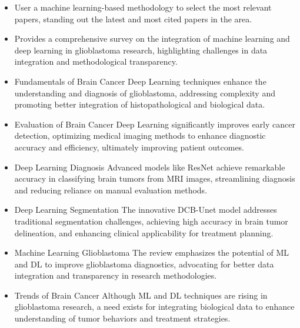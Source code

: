 \documentclass[runningheads]{llncs}
\begin{document}
\begin{itemize}[label=\textbullet]
    \item User a machine learning-based methodology to select the most relevant papers, standing out the latest and most cited papers in the area.
    \item Provides a comprehensive survey on the integration of machine learning and deep learning in glioblastoma research, highlighting challenges in data integration and methodological transparency.
    \item Fundamentals of Brain Cancer Deep Learning techniques enhance the understanding and diagnosis of glioblastoma, addressing complexity and promoting better integration of histopathological and biological data.
    \item Evaluation of Brain Cancer Deep Learning significantly improves early cancer detection, optimizing medical imaging methods to enhance diagnostic accuracy and efficiency, ultimately improving patient outcomes.
    \item Deep Learning Diagnosis Advanced models like ResNet achieve remarkable accuracy in classifying brain tumors from MRI images, streamlining diagnosis and reducing reliance on manual evaluation methods.
    \item Deep Learning Segmentation The innovative DCB-Unet model addresses traditional segmentation challenges, achieving high accuracy in brain tumor delineation, and enhancing clinical applicability for treatment planning.
    \item Machine Learning Glioblastoma The review emphasizes the potential of ML and DL to improve glioblastoma diagnostics, advocating for better data integration and transparency in research methodologies.
    \item Trends of Brain Cancer Although ML and DL techniques are rising in glioblastoma research, a need exists for integrating biological data to enhance understanding of tumor behaviors and treatment strategies.
\end{itemize}
\end{document}
